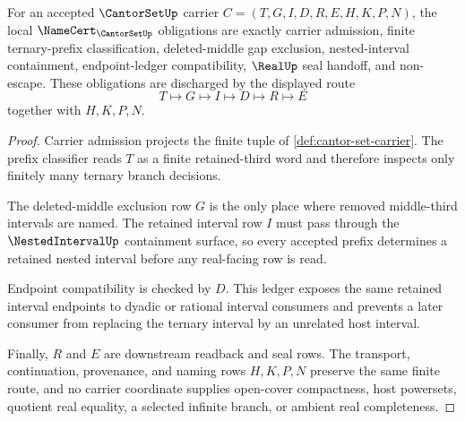 \begin{theorem}
\label{thm:cantor-set-namecert-obligations}
For an accepted $\CantorSetUp$ carrier $C=(T,G,I,D,R,E,H,K,P,N)$, the local $\NameCert_{\CantorSetUp}$ obligations are exactly carrier admission, finite ternary-prefix classification, deleted-middle gap exclusion, nested-interval containment, endpoint-ledger compatibility, $\RealUp$ seal handoff, and non-escape. These obligations are discharged by the displayed route
$$
T\longmapsto G\longmapsto I\longmapsto D\longmapsto R\longmapsto E
$$
together with $H,K,P,N$.
\end{theorem}
\begin{proof}
Carrier admission projects the finite tuple of \autoref{def:cantor-set-carrier}. The prefix classifier reads $T$ as a finite retained-third word and therefore inspects only finitely many ternary branch decisions.

The deleted-middle exclusion row $G$ is the only place where removed middle-third intervals are named. The retained interval row $I$ must pass through the $\NestedIntervalUp$ containment surface, so every accepted prefix determines a retained nested interval before any real-facing row is read.

Endpoint compatibility is checked by $D$. This ledger exposes the same retained interval endpoints to dyadic or rational interval consumers and prevents a later consumer from replacing the ternary interval by an unrelated host interval.

Finally, $R$ and $E$ are downstream readback and seal rows. The transport, continuation, provenance, and naming rows $H,K,P,N$ preserve the same finite route, and no carrier coordinate supplies open-cover compactness, host powersets, quotient real equality, a selected infinite branch, or ambient real completeness.
\end{proof}

